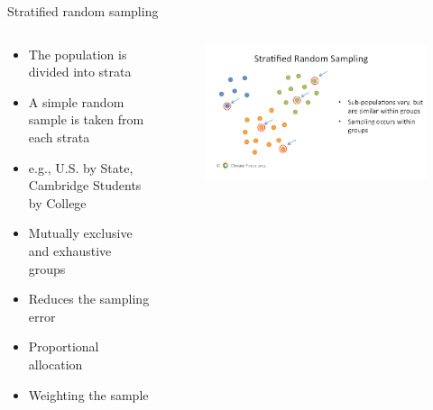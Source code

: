 \documentclass[10pt, compress]{beamer}
\begin{document}
\begin{frame}[t]{Stratified random sampling}
    \begin{columns}
        \begin{block}{}
            \begin{itemize}
                \item The population is divided into strata
                \item A simple random sample is taken from each strata
                \item e.g., U.S. by State, Cambridge Students by College
                \item Mutually exclusive and exhaustive groups
                \item Reduces the sampling error
                \item Proportional allocation
                \item Weighting the sample
            \end{itemize}
        \end{block}
        \begin{block}{}
            \begin{figure}
                \begin{center}
                    \includegraphics[scale=0.25]{img/Slide3.png}
                \end{center}
            \end{figure}
        \end{block}
    \end{columns}

\end{frame}
\end{document}
